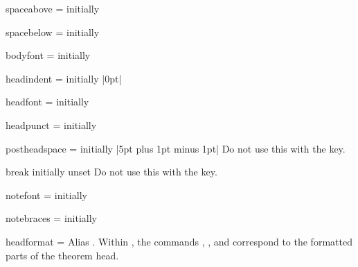 \documentclass{ltxdoc}
\newcommand{\ttbraces}[1]{\braces{\texttt{#1}}}
\begin{document}
\begin{docKey}{spaceabove}
  {=}
  {initially }

\end{docKey}

\begin{docKey}{spacebelow}
  {=}
  {initially }

\end{docKey}

\begin{docKey}{bodyfont}
  {=}
  {initially }

\end{docKey}

\begin{docKey}{headindent}
  {=}
  {initially |0pt|}

\end{docKey}

\begin{docKey}{headfont}
  {=}
  {initially }

\end{docKey}

\begin{docKey}{headpunct}
  {=}
  {initially \ttbraces{.}}

\end{docKey}

\begin{docKey}{postheadspace}
  {=}
  {initially |5pt plus 1pt minus 1pt|}
Do not use this with the  key.
\end{docKey}

\begin{docKey}{break}
  {}
  {initially unset}
Do not use this with the  key.
\end{docKey}

\begin{docKey}{notefont}
  {=}
  {initially }

\end{docKey}

\begin{docKey}{notebraces}
  {=}
  {initially \ttbraces{(}\ttbraces{)}}

\end{docKey}

\begin{docKey}{headformat}
  {=\textbar{}\textbar{}}
  {}
Alias . Within , the commands , , and  correspond to the formatted parts of the theorem head.
\end{docKey}
\end{document}
